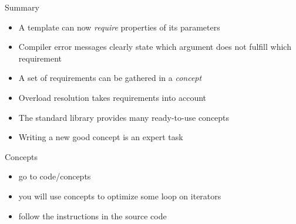 \begin{frame}
    \begin{block}{Summary}
      \begin{itemize}
      \item A template can now \emph{require} properties of its parameters
      \item Compiler error messages clearly state which argument does not fulfill which requirement
      \item A set of requirements can be gathered in a \emph{concept}
      \item Overload resolution takes requirements into account
      \item The standard library provides many ready-to-use concepts
      \item Writing a new good concept is an expert task
      \end{itemize}
    \end{block}
\end{frame}

\begin{frame}
  \begin{exercise}{Concepts}
    \begin{itemize}
    \item go to code/concepts
    \item you will use concepts to optimize some loop on iterators
    \item follow the instructions in the source code
    \end{itemize}
  \end{exercise}
\end{frame}
